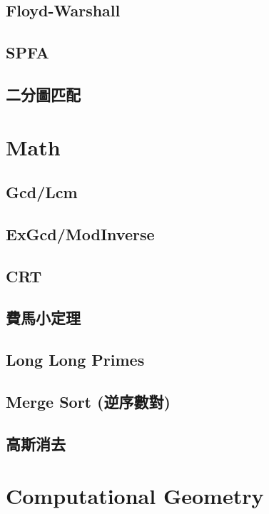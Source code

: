 	\subsection{Floyd-Warshall}
		
	\subsection{SPFA}
		
	\subsection{二分圖匹配}
		
\section{Math}
	\subsection{Gcd/Lcm}
		
	\subsection{ExGcd/ModInverse}
		
	\subsection{CRT}
		
	\subsection{費馬小定理}
		
	\subsection{Long Long Primes}
		
	\subsection{Merge Sort (逆序數對)}
		
	\subsection{高斯消去}
		
\section{Computational Geometry}
